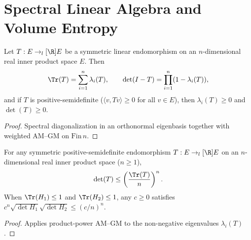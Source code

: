 
\chapter{Spectral Linear Algebra and Volume Entropy}

\begin{theorem}
\label{thm_spectral_trace_det}
\leanok
Let $T : E \to_l[\R] E$ be a symmetric linear endomorphism on an $n$-dimensional real inner product space $E$. Then
$$\Tr(T) = \sum_{i=1}^n \lambda_i(T), \qquad \det(I - T) = \prod_{i=1}^n (1 - \lambda_i(T)),$$
and if $T$ is positive-semidefinite ($\langle v, T v\rangle \ge 0$ for all $v \in E$), then $\lambda_i(T) \ge 0$ and $\det(T) \ge 0$.
\end{theorem}
\begin{proof}\leanok Spectral diagonalization in an orthonormal eigenbasis together with weighted AM--GM on $\mathrm{Fin}\,n$.\end{proof}

\begin{theorem}
\label{thm_trace_det_amgm}
\leanok
{}
For any symmetric positive-semidefinite endomorphism $T : E \to_l[\R] E$ on an $n$-dimensional real inner product space ($n \ge 1$),
$$\det(T) \le \left(\frac{\Tr(T)}{n}\right)^n.$$
When $\Tr(H_1) \le 1$ and $\Tr(H_2) \le 1$, any $c \ge 0$ satisfies $c^n \sqrt{\det H_1}\sqrt{\det H_2} \le (c/n)^n$.
\end{theorem}
\begin{proof}\leanok Applies product-power AM--GM to the non-negative eigenvalues $\lambda_i(T)$.\end{proof}


